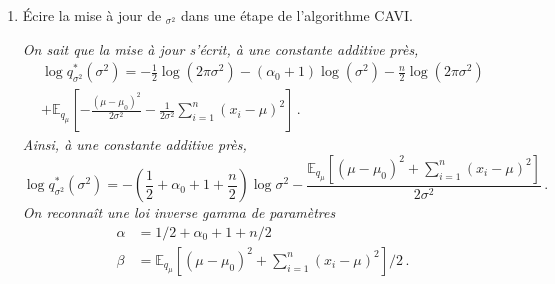 \documentclass[a4paper,10pt,fleqn]{article}
\newcommand{\1}{\ensuremath{\mathbbm{1}}}
\begin{document}
\begin{enumerate}
\vspace{.2cm}

{\em
On sait que la mise \`a jour s'\'ecrit, \`a une constante additive pr\`es,
$$
\log q^*_\mu(\mu) = \mathbb{E}_{q_{\sigma^2}}\left[- \frac{(\mu-\mu_0)^2}{2\sigma^2} - \frac{1}{2\sigma^2}\sum_{i=1}^n(x_i-\mu)^2\right]\,.
$$
Ainsi, \`a une constante additive pr\`es,
$$
\log q^*_\mu(\mu) = -\mathbb{E}_{q_{\sigma^2}}\left[\frac{n+1}{2\sigma^2}\left(\mu - \frac{\mu_0 + n\bar x_n}{n+1}\right)^2\right]\,.
$$
o\`u $\bar x_n = \sum_{i=1}^n x_i/n$. Ainsi, %
$$
\log q^*_\mu(\mu) = -\frac{1}{2}(n+1)\mathbb{E}_{q_{\sigma^2}}[1/\sigma^2]\left(\mu - \frac{\mu_0 + n\bar x_n}{n+1}\right)^2\,.
$$
On en d\'eduit que $q^*_\mu$ est la densit\'e de la loi gaussienne de moyenne $(\mu_0 + n\bar x_n)/(n+1)$  et dont l'inverse de la variance est $(n+1)\mathbb{E}_{q_{\sigma^2}}[1/\sigma^2]$ (qui est calculable lorsque $q_{\sigma^2}$ est une loi inverse gamma).
}
\item \'Ecire la mise \`a jour de $_{\sigma^2}$ dans une \'etape de l'algorithme CAVI. 

\vspace{.2cm}

{\em
On sait que la mise \`a jour s'\'ecrit, \`a une constante additive pr\`es,
\begin{multline*}
\log q^*_{\sigma^2}(\sigma^2) =  -\frac{1}{2}\log(2\pi \sigma^2) - (\alpha_0+1)\log(\sigma^{2})  -\frac{n}{2}\log(2\pi \sigma^2)\\
+\mathbb{E}_{q_{\mu}}\left[- \frac{(\mu-\mu_0)^2}{2\sigma^2}  - \frac{1}{2\sigma^2}\sum_{i=1}^n(x_i-\mu)^2\right]\,.
\end{multline*}
Ainsi, \`a une constante additive pr\`es,
$$
\log q^*_{\sigma^2}(\sigma^2) = -\left(\frac{1}{2} + \alpha_0+1+\frac{n}{2}\right)\log\sigma^2 -\frac{\mathbb{E}_{q_{\mu}}\left[(\mu-\mu_0)^2 + \sum_{i=1}^n(x_i-\mu)^2\right]}{2\sigma^2}\,.
$$
On reconna\^it une loi inverse gamma de param\`etres 
\begin{align*}
\alpha &= 1/2 + \alpha_0+1+n/2\\
\beta &= \mathbb{E}_{q_{\mu}}\left[(\mu-\mu_0)^2 + \sum_{i=1}^n(x_i-\mu)^2\right]/2\,.
\end{align*}
}
\end{enumerate}
\end{document}

